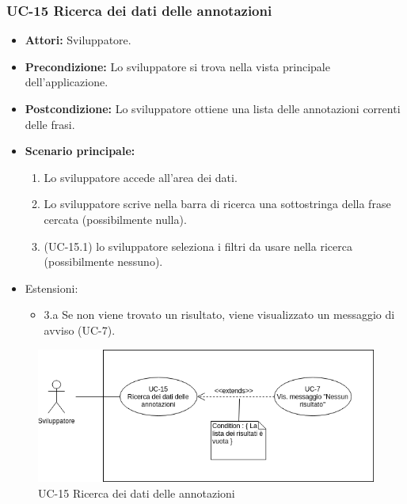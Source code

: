 \subsubsection{UC-15 Ricerca dei dati delle annotazioni}	
		\begin{itemize}
			\item \textbf{Attori:} Sviluppatore.
			\item \textbf{Precondizione:} Lo sviluppatore si trova nella vista principale dell'applicazione.
			\item \textbf{Postcondizione:} Lo sviluppatore ottiene una lista delle annotazioni correnti delle frasi.
			\item \textbf{Scenario principale:}
				\begin{enumerate}
					\item Lo sviluppatore accede all'area dei dati.
					\item Lo sviluppatore scrive nella barra di ricerca una sottostringa della frase cercata (possibilmente nulla).
					\item (UC-15.1) lo sviluppatore seleziona i filtri da usare nella ricerca (possibilmente nessuno).
				\end{enumerate}
			\item Estensioni:
				\begin{itemize}
					\item 3.a Se non viene trovato un risultato, viene visualizzato un messaggio di avviso (UC-7).
				\end{itemize}
		\end{itemize}

\begin{figure}[h]
			\centering
			\includegraphics[scale=0.7]{images/UC-15.png}
			\caption{UC-15 Ricerca dei dati delle annotazioni}
		\end{figure}

	
